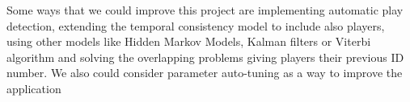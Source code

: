 Some ways that we could improve this project are implementing automatic play detection, extending the temporal consistency model to include also players, using other models like Hidden Markov Models, Kalman filters or Viterbi algorithm and solving the overlapping problems giving players their previous ID number. We also could consider parameter auto-tuning as a way to improve the application
